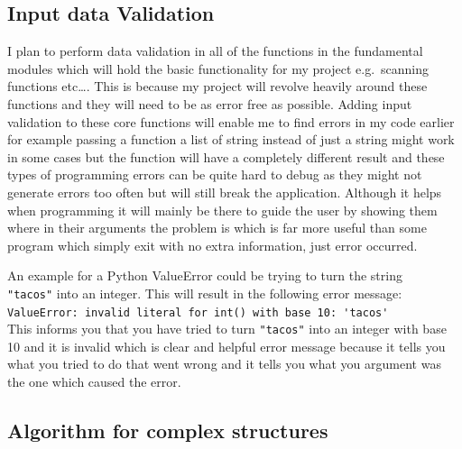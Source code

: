 \documentclass[titlepage]{article}
\let\Oldsubsection\subsection{}
\renewcommand{\subsection}{\FloatBarrier\Oldsubsection}
\begin{document}
\subsection{Input data Validation}

I plan to perform data validation in all of the functions in the fundamental modules
which will hold the basic functionality for my project e.g.\ scanning functions etc\ldots.
This is because my project will revolve heavily around these functions and they
will need to be as error free as possible.
Adding input validation to these core functions will enable me to find
errors in my code earlier for example passing a function a list of
string instead of just a string might work in some cases but
the function will have a completely different result and these
types of programming errors can be quite hard to debug as they
might not generate errors too often but will still break the application.
Although it helps when programming it will mainly be there to guide
the user by showing them where in their arguments the problem is
which is far more useful than some program which simply exit with
no extra information, just error occurred.

An example for a Python ValueError could be trying to turn the string \\
\verb|"tacos"|
into an integer. This will result in the following error message:\\
\verb|ValueError: invalid literal for int() with base 10: 'tacos'| \\
This informs you that you have tried to turn \verb|"tacos"|
into an integer with base 10 and it is invalid which is clear and
helpful error message because it tells you what you tried to do that
went wrong and it tells you what you argument was the one which caused the
error.

\subsection{Algorithm for complex structures}
\end{document}
